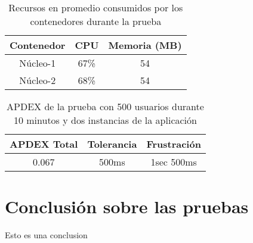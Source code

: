 \begin{table}[]
    \centering
    \makegapedcells
    \begin{tabular}{|c|c|c}
    \hline
    Contenedor & CPU & Memoria (MB)\\ \hline
    Núcleo-1 & 67\% & 54 \\ \hline
    Núcleo-2 & 68\% & 54 \\ \hline
    \end{tabular}
    \caption{Recursos en promedio consumidos por los contenedores durante la prueba}
    \label{tab:tabla_planes}
\end{table}

\begin{table}[]
    \centering
    \makegapedcells
    \begin{tabular}{|c|c|c}
    \hline
    APDEX Total & Tolerancia & Frustración\\ \hline
    0.067 & 500ms & 1sec 500ms \\ \hline
    \end{tabular}
    \caption{APDEX de la prueba con 500 usuarios durante 10 minutos y dos instancias de la aplicación}
    \label{tab:tabla_planes}
\end{table}
\break
\section{Conclusión sobre las pruebas}

Esto es una conclusion

